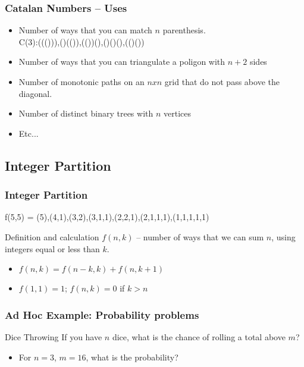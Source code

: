 \documentclass{beamer}
\begin{document}
\begin{frame}
  \frametitle{Catalan Numbers -- Uses}
  \begin{itemize}
    \item Number of ways that you can match $n$ parenthesis.\\
      C(3):((())),()(()),(())(),()()(),(()())

      \medskip

    \item Number of ways that you can triangulate a poligon with $n+2$ sides
    \item Number of monotonic paths on an $nxn$ grid that do not pass above
      the diagonal.
    \item Number of distinct binary trees with $n$ vertices
    \item Etc...
  \end{itemize}
\end{frame}

\subsection{Integer Partition}
\begin{frame}
  \frametitle{Integer Partition}
  \begin{block}{}
    f(5,5) = (5),(4,1),(3,2),(3,1,1),(2,2,1),(2,1,1,1),(1,1,1,1,1)
  \end{block}
  \begin{block}{Definition and calculation}
    $f(n,k)$ -- number of ways that we can sum $n$, using integers
    equal or less than $k$.

    \bigskip

    \begin{itemize}
    \item $f(n,k) = f(n-k,k) + f(n, k+1)$
    \item $f(1,1) = 1$; $f(n,k) = 0$ if $k > n$
    \end{itemize}
  \end{block}
\end{frame}

\begin{frame}
  \frametitle{Ad Hoc Example: Probability problems}

  {\smaller
    \begin{block}{Dice Throwing}
      If you have $n$ dice, what is the chance of rolling a total above $m$?
    \end{block}

    \begin{itemize}
    \item {} For $n=3$, $m=16$, what is the probability?
    \end{itemize}
  }
\end{frame}
\end{document}

